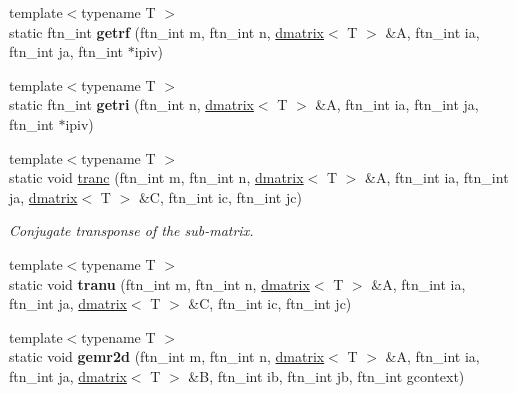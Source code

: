 \begin{DoxyCompactItemize}
\item 
\hypertarget{classsddk_1_1linalg_3_01_c_p_u_01_4_a43364f250d9f0490b605c4d7397dffe7}{}{\footnotesize template$<$typename T $>$ }\\static ftn\+\_\+int {\bfseries getrf} (ftn\+\_\+int m, ftn\+\_\+int n, \hyperlink{classsddk_1_1dmatrix}{dmatrix}$<$ T $>$ \&A, ftn\+\_\+int ia, ftn\+\_\+int ja, ftn\+\_\+int $\ast$ipiv)\label{classsddk_1_1linalg_3_01_c_p_u_01_4_a43364f250d9f0490b605c4d7397dffe7}

\item 
\hypertarget{classsddk_1_1linalg_3_01_c_p_u_01_4_a5356cfed1b5d9b7b1c19de4d99c2e4c0}{}{\footnotesize template$<$typename T $>$ }\\static ftn\+\_\+int {\bfseries getri} (ftn\+\_\+int n, \hyperlink{classsddk_1_1dmatrix}{dmatrix}$<$ T $>$ \&A, ftn\+\_\+int ia, ftn\+\_\+int ja, ftn\+\_\+int $\ast$ipiv)\label{classsddk_1_1linalg_3_01_c_p_u_01_4_a5356cfed1b5d9b7b1c19de4d99c2e4c0}

\item 
{\footnotesize template$<$typename T $>$ }\\static void \hyperlink{classsddk_1_1linalg_3_01_c_p_u_01_4_ad7eb0c119be5c91800b29bf15eba6c8f}{tranc} (ftn\+\_\+int m, ftn\+\_\+int n, \hyperlink{classsddk_1_1dmatrix}{dmatrix}$<$ T $>$ \&A, ftn\+\_\+int ia, ftn\+\_\+int ja, \hyperlink{classsddk_1_1dmatrix}{dmatrix}$<$ T $>$ \&C, ftn\+\_\+int ic, ftn\+\_\+int jc)
\begin{DoxyCompactList}\small\item\em Conjugate transponse of the sub-\/matrix. \end{DoxyCompactList}\item 
\hypertarget{classsddk_1_1linalg_3_01_c_p_u_01_4_a3164ad40ab4bb2e54a5d604a01825aa5}{}{\footnotesize template$<$typename T $>$ }\\static void {\bfseries tranu} (ftn\+\_\+int m, ftn\+\_\+int n, \hyperlink{classsddk_1_1dmatrix}{dmatrix}$<$ T $>$ \&A, ftn\+\_\+int ia, ftn\+\_\+int ja, \hyperlink{classsddk_1_1dmatrix}{dmatrix}$<$ T $>$ \&C, ftn\+\_\+int ic, ftn\+\_\+int jc)\label{classsddk_1_1linalg_3_01_c_p_u_01_4_a3164ad40ab4bb2e54a5d604a01825aa5}

\item 
\hypertarget{classsddk_1_1linalg_3_01_c_p_u_01_4_a9f22d98a861b74c989fc89791931278f}{}{\footnotesize template$<$typename T $>$ }\\static void {\bfseries gemr2d} (ftn\+\_\+int m, ftn\+\_\+int n, \hyperlink{classsddk_1_1dmatrix}{dmatrix}$<$ T $>$ \&A, ftn\+\_\+int ia, ftn\+\_\+int ja, \hyperlink{classsddk_1_1dmatrix}{dmatrix}$<$ T $>$ \&B, ftn\+\_\+int ib, ftn\+\_\+int jb, ftn\+\_\+int gcontext)\label{classsddk_1_1linalg_3_01_c_p_u_01_4_a9f22d98a861b74c989fc89791931278f}

\end{DoxyCompactItemize}



